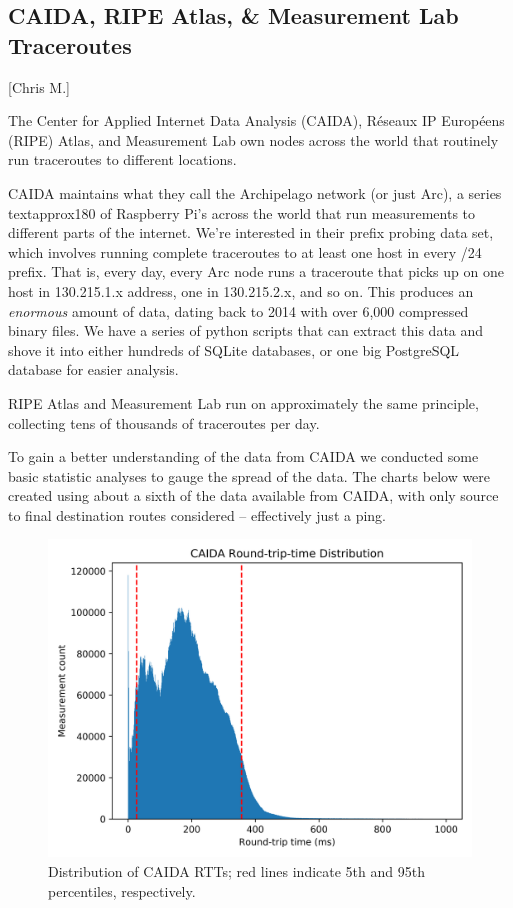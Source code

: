 \documentclass[12pt]{article}
\begin{document}
\subsection{CAIDA, RIPE Atlas, \& Measurement Lab Traceroutes}[Chris M.]

The Center for Applied Internet Data Analysis (CAIDA), R\'eseaux IP Europ\'eens (RIPE) Atlas, and Measurement Lab own nodes across the world that routinely run traceroutes to different locations. 

CAIDA maintains what they call the Archipelago network (or just Arc), a series textapprox{}180 of Raspberry Pi's across the world that run measurements to different parts of the internet. We're interested in their prefix probing data set, which involves running complete traceroutes to at least one host in every /24 prefix. That is, every day, every Arc node runs a traceroute that picks up on one host in 130.215.1.x address, one in 130.215.2.x, and so on. This produces an \textit{enormous} amount of data, dating back to 2014 with over 6,000 compressed binary files. We have a series of python scripts that can extract this data and shove it into either hundreds of SQLite databases, or one big PostgreSQL database for easier analysis.

RIPE Atlas and Measurement Lab run on approximately the same principle, collecting tens of thousands of traceroutes per day.

To gain a better understanding of the data from CAIDA we conducted some basic statistic analyses to gauge the spread of the data. The charts below were created using about a sixth of the data available from CAIDA, with only source to final destination routes considered -- effectively just a ping.

\begin{figure}[H]
    \centering
    \includegraphics[width=\textwidth]{images/CAIDA_rtt_dist.png}
    \caption{Distribution of CAIDA RTTs; red lines indicate 5th and 95th percentiles, respectively.}
    \label{fig:rtt_dist}
\end{figure}
\end{document}
